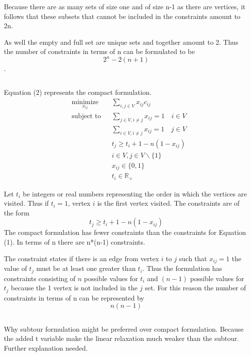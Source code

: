 \documentclass[11pt,a4paper,english]{article}
\begin{document}
Because there are as many sets of size one and of size n-1 as there are vertices, it follows that these subsets that cannot be included in the constraints amount to 2n. 

As well the empty and full set are unique sets and together amount to 2. 
Thus the number of constraints in terms of n can be formulated to be $$2^n - 2(n+1)$$.

\subsection{}
Equation (2) represents the compact formulation.  
 \begin{equation}
   \label{eq:tsp:subtour}
   \begin{aligned}
     & \underset{x_{ij}}{\text{minimize}}
     & & \sum_{i,j \in V} x_{ij}c_{ij} \\
     & \text{subject to}
     & & \sum_{j \in V, i \neq j} x_{ij} = 1 \quad i \in V \\
     & & & \sum_{i \in V, i \neq j} x_{ij} = 1 \quad j \in V \\
     & & & t_{j} \geq t_{i} + 1 - n(1-x_{ij} )\\
     & & & i\in V, j\in V \backslash \{1\} \\
     & & & x_{ij} \in \{0,1\}\\
     & & & t_{i}\in\mathbb{R}_+
   \end{aligned}
 \end{equation}
 
 Let $t_{i}$ be integers or real numbers representing the order in which the vertices are visited. Thus if $t_{i} = 1$, vertex $i$ is the first vertex visited.
The constraints are of the form $$t_{j} \geq t_{i} + 1 - n(1-x_{ij} )$$ The compact formulation has fewer constraints than the constraints for Equation (1).
In terms of n there are n*(n-1) constraints.

The constraint states if there is an edge from vertex $i$ to $j$ such that $x_{ij} = 1$ the value of $t_{j}$ must be at least one greater than $t_{i}$. Thus the formulation has constraints consisting of $n$ possible values for $t_{i}$ and $(n-1)$ possible values for $t_{j}$ because the 1 vertex is not included in the $j$ set. For this reason the number of constraints in terms of n can be represented by $$n(n-1)$$

\subsection{}
Why subtour formulation might be preferred over compact formulation.
Because the added t variable make the linear relaxation much weaker than the subtour. Further explanation needed.
\end{document}

